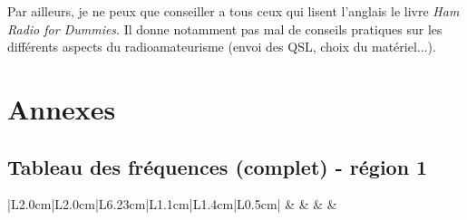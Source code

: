 \documentclass[a4paper,12pt,oneside]{report} %
\begin{document}
	Par ailleurs, je ne peux que conseiller a tous ceux qui lisent l'anglais le livre \textit{Ham Radio for Dummies}. Il donne notamment pas mal de conseils pratiques sur les différents aspects du radioamateurisme (envoi des QSL, choix du matériel...).


\chapter{Annexes}
	\section{Tableau des fréquences (complet) - région 1} \label{frequencyAllocationFull}
		\begin{center}
		\begin{longtable}{|L{2.0cm}|L{2.0cm}|L{6.23cm}|L{1.1cm}|L{1.4cm}|L{0.5cm}|}
			\hline
			 & & & &\tabularnewline
			

\end{longtable}
\end{center}
\end{document}
